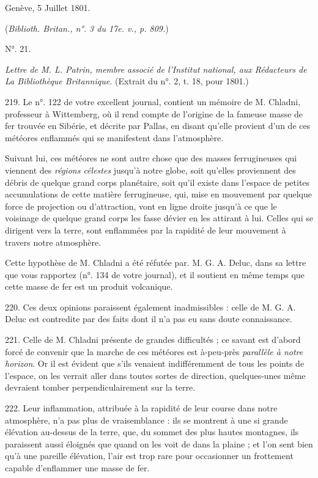 \documentclass[a4paper, 11pt, oneside, polutonikogreek, french]{article}
\begin{document}
Genève, 5 Juillet 1801.

(\emph{Biblioth. Britan., n°. 3 du 17e. v., p. 809.})
 
\begin{center}
N°. 21.
\end{center}

\emph{Lettre de M. L. Patrin, membre associé de l'Institut national, aux Rédacteurs de La Bibliothèque Britannique.} (Extrait du n°. 2, t. 18, pour 1801.)

219. \og Le n°. 122 de votre excellent journal, contient un mémoire de M. Chladni, professeur à Wittemberg, où il rend compte de l'origine de la fameuse masse de fer trouvée en Sibérie, et décrite par Pallas, en disant qu'elle provient d'un de ces météores enflammés qui se manifestent dans l'atmosphère. \fg

Suivant lui, ces météores ne sont autre chose que des masses ferrugineuses qui viennent des \emph{régions célestes} jusqu'à notre globe, soit qu'elles proviennent des débris de quelque grand corps planétaire, soit qu'il existe dans l'espace de petites accumulations de cette matière ferrugineuse, qui, mise en mouvement par quelque force de projection ou d'attraction, vont en ligne droite jusqu'à ce que le voisinage de quelque grand corps les fasse dévier en les attirant à lui. Celles qui se dirigent vers la terre, sont enflammées par la rapidité de leur mouvement à travers notre atmosphère.

Cette hypothèse de M. Chladni a été réfutée par. M. G. A. Deluc, dans sa lettre que vous rapportez (n°. 134 de votre journal), et il soutient en même temps que cette masse de fer est un produit volcanique.

220. Ces deux opinions paraissent également inadmissibles : celle de M. G. A. Deluc est contredite par des faits dont il n'a pas eu sans doute connaissance.

221. Celle de M. Chladni présente de grandes difficultés ; ce savant est d'abord forcé de convenir que la marche de ces météores est à-peu-près \emph{parallèle à notre horizon}. Or il est évident que s'ils venaient indifféremment de tous les points de l'espace, on les verrait aller dans toutes sortes de direction, quelques-unes même devraient tomber perpendiculairement sur la terre.

222. Leur inflammation, attribuée à la rapidité de leur course dans notre atmosphère, n'a pas plus de vraisemblance : ils se montrent à une si grande élévation au-dessus de la terre, que, du sommet des plus hautes montagnes, ils paraissent aussi éloignés que quand on les voit de dans la plaine ; et l'on sent bien qu'à une pareille élévation, l'air est trop rare pour occasionner un frottement capable d'enflammer une masse de fer.
\end{document}
